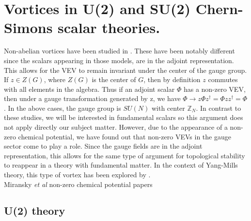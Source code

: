 
    \graphicspath{{Background_Folder/figures/PNG/}{Background_Folder/figures/PDF/}{Background_Folder/figures/}}

\chapter{Vortices in U(2) and SU(2) Chern-Simons scalar theories.}



Non-abelian vortices have been studied in \cite{deVega1986, Kumar1986, 1306.5146, NavarroLrida2010}. These have been notably different since the scalars appearing in those models, are in the adjoint representation. This allows for the VEV to remain invariant under the center of the gauge group. If $z\in Z(G)$, where $Z(G)$ is the center of $G$, then by definition $z$ commutes with all elements in the algebra. Thus if an adjoint scalar $\Phi$ has a non-zero VEV, then under a gauge transformation generated by z, we have $\Phi \rightarrow z\Phi z^{\dag} =\Phi z z^{\dag} = \Phi$. In the above cases, the gauge group is $SU(N)$ with center $\mathbb{Z}_N$. In contrast to these studies, we will be interested in fundamental scalars so this argument does not apply directly our subject matter. However, due to the appearance of a non-zero chemical potential, we have found out that non-zero VEVs in the gauge sector come to play a role. Since the gauge fields are in the adjoint representation, this allows for the same type of argument for topological stability to reappear in a theory with fundamental matter. In the context of Yang-Mills theory, this type of vortex has been explored by \cite{hep-ph/0512203}.\\  
Miransky \textit{et al} non-zero chemical potential papers \cite{hep-ph/0512203, Gusynin2004}


\section{U(2) theory}

